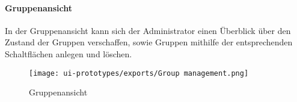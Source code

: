 \paragraph{Gruppenansicht}
In der Gruppenansicht kann sich der Administrator einen Überblick über
den Zustand der Gruppen verschaffen, sowie Gruppen mithilfe der
entsprechenden Schaltflächen anlegen und löschen.
\begin{figure}
  \centering
  \texttt{[image: ui-prototypes/exports/Group management.png]}
  \caption{Gruppenansicht}
  \label{fig:group-management}
\end{figure}
